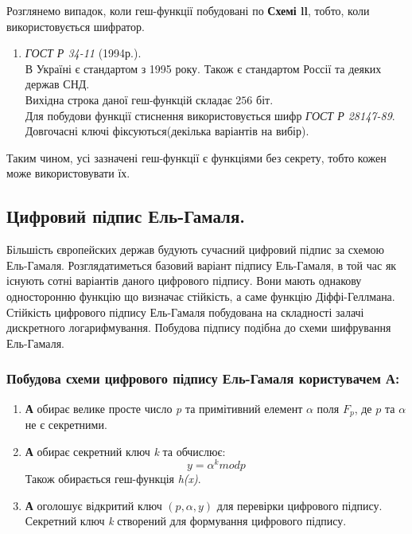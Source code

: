 Розглянемо випадок, коли геш-функції побудовані по \textbf{Схемі ll}, тобто, коли використовується шифратор.
\begin{enumerate}
\item \textit{ГОСТ Р 34-11} (1994р.).\\
В Україні є стандартом з 1995 року. Також є стандартом Россії та деяких держав СНД.\\
Вихідна строка даної геш-функцій складає $256$ біт.\\
Для побудови функції стиснення використовується шифр \textit{ГОСТ Р 28147-89}.\\
Довгочасні ключі фіксуються(декілька варіантів на вибір).
\end{enumerate}
Таким чином, усі зазначені геш-функції є функціями без секрету, тобто кожен може використовувати їх.
\subsection*{Цифровий підпис Ель-Гамаля.}
Більшість європейских держав будують сучасний цифровий підпис за схемою Ель-Гамаля. Розглядатиметься базовий варіант підпису Ель-Гамаля, в той час як існують сотні варіантів даного цифрового підпису. Вони мають однакову односторонню функцію що визначає стійкість, а саме функцію Діффі-Геллмана. Стійкість цифрового підпису Ель-Гамаля побудована на складності залачі дискретного логарифмування. Побудова підпису подібна до схеми шифрування Ель-Гамаля.\\
\subsubsection*{Побудова схеми цифрового підпису Ель-Гамаля користувачем \textbf{А}:}
\begin{enumerate}
\item \textbf{А} обирає велике просте число \textit{p} та примітивний елемент $\alpha$ поля \textit{$F_p$}, де \textit{$p$} та $\alpha$ не є секретними.
\item \textbf{А} обирає секретний ключ \textit{k} та обчислює: $$y=\alpha^{k}mod p$$ Також обирається геш-функція \textit{h(x)}.
\item \textbf{А} оголошує відкритий ключ \textit{$(p,\alpha,y)$} для перевірки цифрового підпису. Секретний ключ \textit{k} створений для формування цифрового підпису.
\end{enumerate}
